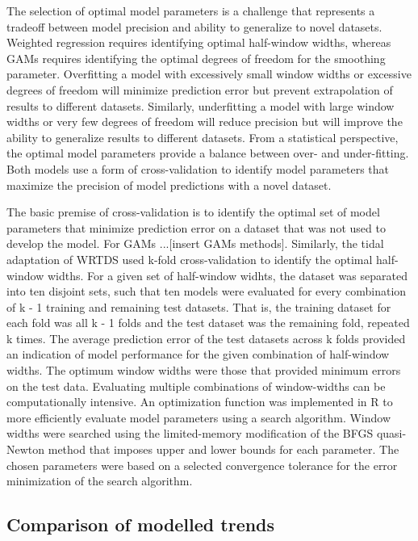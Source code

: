 \documentclass[letterpaper,12pt,oneside]{article}\usepackage[]{graphicx}\usepackage[]{color}
\begin{document}
The selection of optimal model parameters is a challenge that represents a tradeoff between model precision and ability to generalize to novel datasets.  Weighted regression requires identifying optimal half-window widths, whereas \acp{GAM} requires identifying the optimal degrees of freedom for the smoothing parameter.  Overfitting a model with excessively small window widths or excessive degrees of freedom will minimize prediction error but prevent extrapolation of results to different datasets. Similarly, underfitting a model with large window widths or very few degrees of freedom will reduce precision but will improve the ability to generalize results to different datasets. From a statistical perspective, the optimal model parameters provide a balance between over- and under-fitting.  Both models use a form of cross-validation to identify model parameters that maximize the precision of model predictions with a novel dataset.   

The basic premise of cross-validation is to identify the optimal set of model parameters that minimize prediction error on a dataset that was not used to develop the model.  For \acp{GAM} \citep{Hastie90,Zuur12}...[insert GAMs methods]. Similarly, the tidal adaptation of \ac{WRTDS} used k-fold cross-validation to identify the optimal half-window widths. For a given set of half-window widhts, the dataset was separated into ten disjoint sets, such that ten models were evaluated for every combination of k - 1 training and remaining test datasets. That is, the training dataset for each fold was all k - 1 folds and the test dataset was the remaining fold, repeated k times. The average prediction error of the test datasets across k folds provided an indication of model performance for the given combination of half-window widths.  The optimum window widths were those that provided minimum errors on the test data.  Evaluating multiple combinations of window-widths can be computationally intensive. An optimization function was implemented in R  \citep{Byrd95,RDCT15} to more efficiently evaluate model parameters using a search algorithm.  Window widths were searched using the limited-memory modification of the BFGS quasi-Newton method that imposes upper and lower bounds for each parameter.  The chosen parameters were based on a selected convergence tolerance for the error minimization of the search algorithm.  

\subsection{Comparison of modelled trends}
\end{document}
